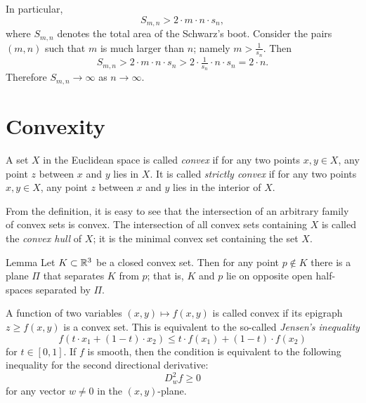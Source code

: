 In particular,
\[S_{m,n}>2\cdot m\cdot n\cdot s_n,\]
where $S_{m,n}$ denotes the total area of the Schwarz's boot.
Consider the pairs $(m,n)$ such that $m$ is much larger than $n$; namely $m>\tfrac1{s_n}$.
Then
\[S_{m,n}> 2\cdot  m\cdot  n\cdot  s_n>2\cdot  \tfrac1{s_n}\cdot  n\cdot  s_n=2\cdot n.\]
Therefore $S_{m,n}\to \infty$ as $n\to \infty$.


\section{Convexity}

A set $X$ in the Euclidean space is called \emph{convex} if for any two points $x,y\in X$, any point $z$ between $x$ and $y$ lies in $X$.
It is called  \emph{strictly convex} if for any two points $x,y\in X$, any point $z$ between $x$ and $y$ lies in the interior of $X$.

From the definition, it is easy to see that the intersection of an arbitrary family of convex sets is convex. 
The intersection of all convex sets containing $X$ is called the \emph{convex hull} of $X$;
it is the minimal convex set containing the set $X$.


\begin{thm}{Lemma}\label{lem:separation}
Let $K\subset \mathbb{R}^3$ be a closed convex set.
Then for any point $p\notin K$ there is a plane $\Pi$ that separates $K$ from $p$;
that is, $K$ and $p$ lie on opposite open half-spaces separated by $\Pi$.
\end{thm}

A function of two variables $(x,y)\mapsto f(x,y)$ is called convex if 
its epigraph $z\ge f(x,y)$ is a convex set.
This is equivalent to the so-called \emph{Jensen's inequality}
\[f \left (t\cdot x_1 + (1-t)\cdot x_2 \right ) \leq t\cdot f(x_1)+ (1-t)\cdot f(x_2)\]
for $t\in[0,1]$.
If $f$ is smooth, then the condition is equivalent to the following inequality for the second directional derivative:
\[D^2_wf\ge 0\]
for any vector $w\ne 0$ in the $(x,y)$-plane.
